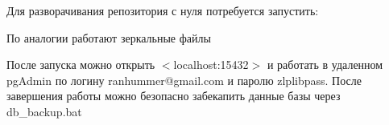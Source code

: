 Для разворачивания репозитория с нуля потребуется запустить\+:


\begin{DoxyCode}{0}

\end{DoxyCode}


По аналогии работают зеркальные файлы

После запуска можно открыть \texorpdfstring{$<$}{<}localhost\+:15432\texorpdfstring{$>$}{>} и работать в удаленном pg\+Admin по логину {\ttfamily ranhummer@gmail.\+com} и паролю {\ttfamily zlplibpass}. После завершения работы можно безопасно забекапить данные базы через {\ttfamily db\+\_\+backup.\+bat} 